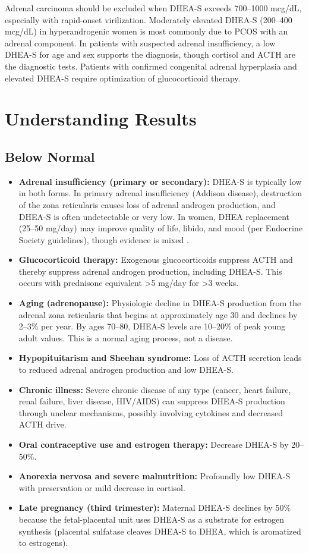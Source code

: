 Adrenal carcinoma should be excluded when DHEA-S exceeds 700--1000 mcg/dL, especially with rapid-onset virilization. Moderately elevated DHEA-S (200--400 mcg/dL) in hyperandrogenic women is most commonly due to PCOS with an adrenal component. In patients with suspected adrenal insufficiency, a low DHEA-S for age and sex supports the diagnosis, though cortisol and ACTH are the diagnostic tests. Patients with confirmed congenital adrenal hyperplasia and elevated DHEA-S require optimization of glucocorticoid therapy.

\section*{Understanding Results}

\subsection*{Below Normal}
\begin{itemize}
  \item \textbf{Adrenal insufficiency (primary or secondary):} DHEA-S is typically low in both forms. In primary adrenal insufficiency (Addison disease), destruction of the zona reticularis causes loss of adrenal androgen production, and DHEA-S is often undetectable or very low. In women, DHEA replacement (25--50 mg/day) may improve quality of life, libido, and mood (per Endocrine Society guidelines), though evidence is mixed \cite{wierman2014androgen}.
  \item \textbf{Glucocorticoid therapy:} Exogenous glucocorticoids suppress ACTH and thereby suppress adrenal androgen production, including DHEA-S. This occurs with prednisone equivalent >5 mg/day for >3 weeks.
  \item \textbf{Aging (adrenopause):} Physiologic decline in DHEA-S production from the adrenal zona reticularis that begins at approximately age 30 and declines by 2--3\% per year. By ages 70--80, DHEA-S levels are 10--20\% of peak young adult values. This is a normal aging process, not a disease.
  \item \textbf{Hypopituitarism and Sheehan syndrome:} Loss of ACTH secretion leads to reduced adrenal androgen production and low DHEA-S.
  \item \textbf{Chronic illness:} Severe chronic disease of any type (cancer, heart failure, renal failure, liver disease, HIV/AIDS) can suppress DHEA-S production through unclear mechanisms, possibly involving cytokines and decreased ACTH drive.
  \item \textbf{Oral contraceptive use and estrogen therapy:} Decrease DHEA-S by 20--50\%.
  \item \textbf{Anorexia nervosa and severe malnutrition:} Profoundly low DHEA-S with preservation or mild decrease in cortisol.
  \item \textbf{Late pregnancy (third trimester):} Maternal DHEA-S declines by 50\% because the fetal-placental unit uses DHEA-S as a substrate for estrogen synthesis (placental sulfatase cleaves DHEA-S to DHEA, which is aromatized to estrogens).
\end{itemize}

